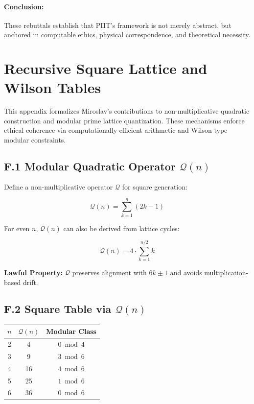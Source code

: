 \documentclass[12]{amsart}
\theoremstyle{plain}
\begin{document}
\paragraph{Conclusion:} These rebuttals establish that PIIT's framework is not merely abstract, but anchored in computable ethics, physical correspondence, and theoretical necessity.

\clearpage

\section{Recursive Square Lattice and Wilson Tables}

This appendix formalizes Miroslav's contributions to non-multiplicative quadratic construction and modular prime lattice quantization. These mechanisms enforce ethical coherence via computationally efficient arithmetic and Wilson-type modular constraints.

\subsection*{F.1 Modular Quadratic Operator $\mathcal{Q}(n)$}

Define a non-multiplicative operator $\mathcal{Q}$ for square generation:

\begin{equation}
\mathcal{Q}(n) = \sum_{k=1}^{n} (2k - 1)
\end{equation}

\noindent
For even $n$, $\mathcal{Q}(n)$ can also be derived from lattice cycles:

\begin{equation}
\mathcal{Q}(n) = 4 \cdot \sum_{k=1}^{n/2} k
\end{equation}

\noindent
\textbf{Lawful Property:} $\mathcal{Q}$ preserves alignment with $6k \pm 1$ and avoids multiplication-based drift.

\subsection*{F.2 Square Table via $\mathcal{Q}(n)$}

\begin{center}
\begin{tabular}{c|c|c}
$n$ & $\mathcal{Q}(n)$ & Modular Class \\
\hline
2 & 4 & $0 \bmod 4$ \\
3 & 9 & $3 \bmod 6$ \\
4 & 16 & $4 \bmod 6$ \\
5 & 25 & $1 \bmod 6$ \\
6 & 36 & $0 \bmod 6$ \\
\end{tabular}
\end{center}
\end{document}
